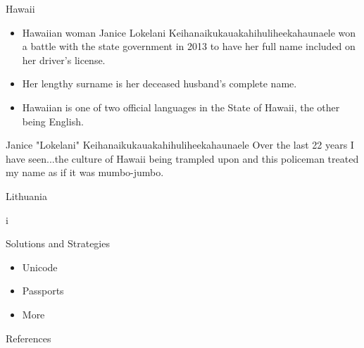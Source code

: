 \documentclass{beamer}
\begin{document}
\begin{frame}{Hawaii}
\begin{itemize}
\item Hawaiian woman Janice Lokelani Keihanaikukauakahihuliheekahaunaele won a
battle with the state government in 2013 to have her full name included on her
driver's license.
\item Her lengthy surname is her deceased husband's complete name.
\item Hawaiian is one of two official languages in the State of Hawaii, the
other being English.
\end{itemize}
\begin{aquote}{Janice "Lokelani" Keihanaikukauakahihuliheekahaunaele}
Over the last 22 years I have seen...the culture of Hawaii being trampled upon
and this policeman treated my name as if it was mumbo-jumbo.
\end{aquote}
\end{frame}

\begin{frame}{Lithuania}

i

\end{frame}

\begin{frame}{Solutions and Strategies}

\begin{itemize}
\item Unicode
\item Passports
\item More
\end{itemize}

\end{frame}

\begin{frame}[allowframebreaks]{References}

\printbibliography

\end{frame}
\end{document}
